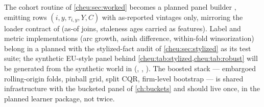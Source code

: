 \begin{codehooks}
The cohort routine of \cref{cheu:sec:worked} becomes a planned panel builder
, emitting rows $(i, y, \tau_{i,y}, Y, C)$ with as-reported vintages only,
mirroring the loader contract of  (as-of joins, staleness ages
carried as features). Label and metric implementations (arc growth, asinh difference,
within-fold winsorization) belong in a planned  with the stylized-fact
audit of \cref{cheu:sec:stylized} as its test suite; the synthetic EU-style panel behind
\cref{cheu:tab:stylized,cheu:tab:robust} will be generated from the synthetic world in
 (, , ). The
boosted stack --- embargoed rolling-origin folds, pinball grid, split CQR, firm-level bootstrap
--- is shared infrastructure with the bucketed panel of \cref{ch:buckets} and should live once,
in the planned  learner package, not twice.
\end{codehooks}
